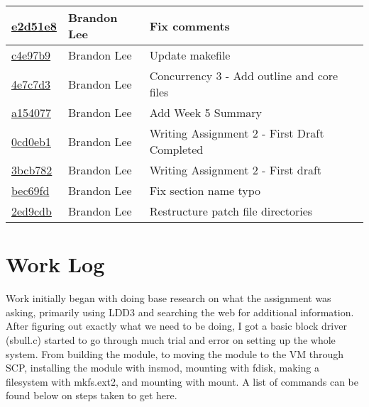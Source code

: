 \documentclass[letterpaper,10pt,titlepage]{article}
\begin{document}
\begin{tabular}{l l l}
\href{https://github.com/brandonlee503/Operating-Systems-II/commit/e2d51e8d76a94e1b7aff691063caabe203cd24af}{e2d51e8} & Brandon Lee & Fix comments\\\hline
\href{https://github.com/brandonlee503/Operating-Systems-II/commit/c4e97b9e39c3fdd1e75e5251806c8ff4014a2390}{c4e97b9} & Brandon Lee & Update makefile\\\hline
\href{https://github.com/brandonlee503/Operating-Systems-II/commit/4e7c7d345149160901300f36322cc74ad8a2e847}{4e7c7d3} & Brandon Lee & Concurrency 3 - Add outline and core files\\\hline
\href{https://github.com/brandonlee503/Operating-Systems-II/commit/a154077e72b345a63298daafe214af91ef36eb54}{a154077} & Brandon Lee & Add Week 5 Summary\\\hline
\href{https://github.com/brandonlee503/Operating-Systems-II/commit/0cd0eb1d541b9b592d322a34be7f9bae9e6da7ac}{0cd0eb1} & Brandon Lee & Writing Assignment 2 - First Draft Completed\\\hline
\href{https://github.com/brandonlee503/Operating-Systems-II/commit/3bcb782120ad1e9ebdd822c9f89775f330a93da9}{3bcb782} & Brandon Lee & Writing Assignment 2 - First draft\\\hline
\href{https://github.com/brandonlee503/Operating-Systems-II/commit/bec69fd13b88df6a21023c87fc89d88d8bcb1bcc}{bec69fd} & Brandon Lee & Fix section name typo\\\hline
\href{https://github.com/brandonlee503/Operating-Systems-II/commit/2ed9cdb0f476813d75f1dc61a3b63a66e6dd835e}{2ed9cdb} & Brandon Lee & Restructure patch file directories\\\hline
\end{tabular}

\newpage

\section{Work Log}

Work initially began with doing base research on what the assignment was asking, primarily using LDD3 and searching the web for additional information.  After figuring out exactly what we need to be doing, I got a basic block driver (sbull.c) started to go through much trial and error on setting up the whole system.  From building the module, to moving the module to the VM through SCP, installing the module with insmod, mounting with fdisk, making a filesystem with mkfs.ext2, and mounting with mount.  A list of commands can be found below on steps taken to get here.\\
\end{document}
